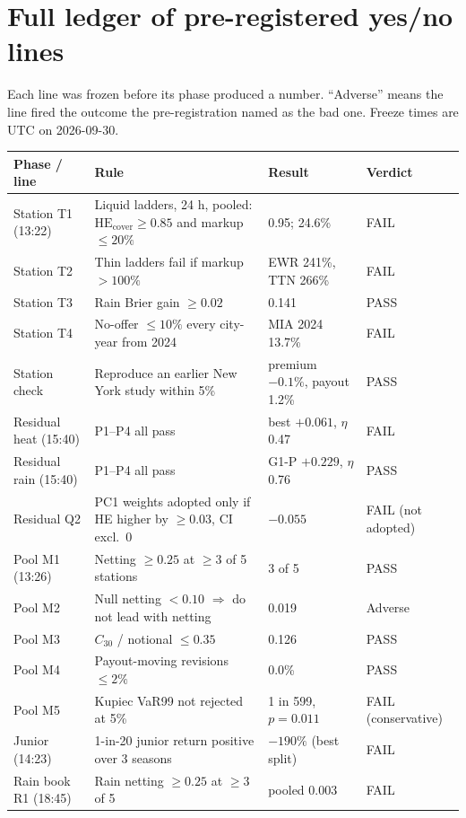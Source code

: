 \documentclass[11pt]{article}
\newcommand{\HEcov}{\mathrm{HE}_{\mathrm{cover}}}
\begin{document}
\appendix

\section{Full ledger of pre-registered yes/no lines}
\label{app:ledger}

Each line was frozen before its phase produced a number. ``Adverse'' means the line fired the outcome the pre-registration named as the bad one. Freeze times are UTC on 2026-09-30.

\begin{small}
\begin{longtable}{p{2.6cm}p{6.0cm}p{3.6cm}p{2.2cm}}
\toprule
Phase / line & Rule & Result & Verdict \\
\midrule
\endhead
Station T1 (13:22) & Liquid ladders, 24 h, pooled: $\HEcov \ge 0.85$ and markup $\le 20\%$ & 0.95; 24.6\% & FAIL \\
Station T2 & Thin ladders fail if markup $> 100\%$ & EWR 241\%, TTN 266\% & FAIL \\
Station T3 & Rain Brier gain $\ge 0.02$ & 0.141 & PASS \\
Station T4 & No-offer $\le 10\%$ every city-year from 2024 & MIA 2024 13.7\% & FAIL \\
Station check & Reproduce an earlier New York study within 5\% & premium $-0.1\%$, payout 1.2\% & PASS \\
Residual heat (15:40) & P1--P4 all pass & best $+0.061$, $\eta$ 0.47 & FAIL \\
Residual rain (15:40) & P1--P4 all pass & G1-P $+0.229$, $\eta$ 0.76 & PASS \\
Residual Q2 & PC1 weights adopted only if HE higher by $\ge 0.03$, CI excl.\ 0 & $-0.055$ & FAIL (not adopted) \\
Pool M1 (13:26) & Netting $\ge 0.25$ at $\ge 3$ of 5 stations & 3 of 5 & PASS \\
Pool M2 & Null netting $< 0.10$ $\Rightarrow$ do not lead with netting & 0.019 & Adverse \\
Pool M3 & $C_{30}$ / notional $\le 0.35$ & 0.126 & PASS \\
Pool M4 & Payout-moving revisions $\le 2\%$ & 0.0\% & PASS \\
Pool M5 & Kupiec VaR99 not rejected at 5\% & 1 in 599, $p = 0.011$ & FAIL (conservative) \\
Junior (14:23) & 1-in-20 junior return positive over 3 seasons & $-190\%$ (best split) & FAIL \\
Rain book R1 (18:45) & Rain netting $\ge 0.25$ at $\ge 3$ of 5 & pooled 0.003 & FAIL \\

\end{longtable}
\end{small}
\end{document}
